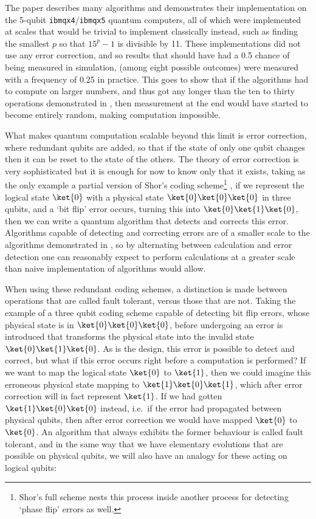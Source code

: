 The paper \cite{algos} describes many algorithms and demonstrates their implementation on the 5-qubit \verb`ibmqx4`/\verb`ibmqx5` quantum computers, all of which were implemented at scales that would be trivial to implement classically instead, such as finding the smallest $p$ so that $15^p-1$ is divisible by 11. These implementations did not use any error correction, and so results that should have had a 0.5 chance of being measured in simulation, (among eight possible outcomes) were measured with a frequency of 0.25 in practice. This goes to show that if the algorithms had to compute on larger numbers, and thus got any longer than the ten to thirty operations demonstrated in \cite{algos}, then measurement at the end would have started to become entirely random, making computation impossible.

What makes quantum computation scalable beyond this limit is error correction, where redundant qubits are added, so that if the state of only one qubit changes then it can be reset to the state of the others. The theory of error correction is very sophisticated but it is enough for now to know only that it exists, taking as the only example a partial version of Shor's coding scheme\footnote{Shor's full scheme nests this process inside another process for detecting `phase flip' errors as well.} \cite{shor-encoding}, if we represent the logical state $\ket{0}$ with a physical state $\ket{0}\ket{0}\ket{0}$ in three qubits, and a `bit flip' error occurs, turning this into $\ket{0}\ket{1}\ket{0}$, then we can write a quantum algorithm that detects and corrects this error. Algorithms capable of detecting and correcting errors are of a smaller scale to the algorithms demonstrated in \cite{algos}, so by alternating between calculation and error detection one can reasonably expect to perform calculations at a greater scale than naive implementation of algorithms would allow.

When using these redundant coding schemes, a distinction is made between operations that are called fault tolerant, versus those that are not. Taking the example of a three qubit coding scheme capable of detecting bit flip errors, whose physical state is in $\ket{0}\ket{0}\ket{0}$, before undergoing an error is introduced that transforms the physical state into the invalid state $\ket{0}\ket{1}\ket{0}$. As is the design, this error is possible to detect and correct, but what if this error occurs right before a computation is performed? If we want to map the logical state $\ket{0}$ to $\ket{1}$, then we could imagine this erroneous physical state mapping to $\ket{1}\ket{0}\ket{1}$, which after error correction will in fact represent $\ket{1}$. If we had gotten $\ket{1}\ket{0}\ket{0}$ instead, i.e.\ if the error had propagated between physical qubits, then after error correction we would have mapped $\ket{0}$ to $\ket{0}$. An algorithm that always exhibits the former behaviour is called fault tolerant, and in the same way that we have elementary evolutions that are possible on physical qubits, we will also have an analogy for these acting on logical qubits:

